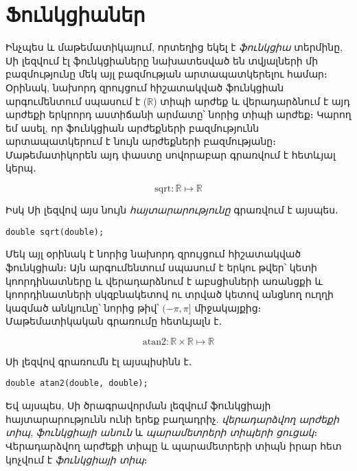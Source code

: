 \chapter{Ֆունկցիաներ}


Ինչպես և մաթեմատիկայում, որտեղից եկել է \emph{ֆունկցիա}
 տերմինը, Սի լեզվում էլ ֆունկցիաները նախատեսված
են տվյալների մի բազմությունը մեկ այլ բազմության արտապատկերելու
համար։ Օրինակ, նախորդ զրույցում հիշատակված 
ֆունկցիան արգումենտում սպասում է  (\(\mathbb{R}\)) տիպի
արժեք և վերադարձնում է այդ արժեքի երկրորդ աստիճանի արմատը՝ նորից
 տիպի արժեք։ Կարող եմ ասել, որ  ֆունկցիան
 արժեքների բազմությունն արտապատկերում է նույն
 արժեքների բազմությանը։ Մաթեմատիկորեն այդ փաստը
սովորաբար գրառվում է հետևյալ կերպ․

\[
\mathrm{sqrt}: \mathbb{R}\mapsto\mathbb{R}
\]

Իսկ Սի լեզվով այս նույն \emph{հայտարարությունը} գրառվում է այսպես․

\begin{Verbatim}
double sqrt(double);
\end{Verbatim}

Մեկ այլ օրինակ է նորից նախորդ զրույցում հիշատակված 
 ֆունկցիան։ Այն արգումենտում սպասում է երկու 
թվեր՝ կետի կոորդինատները և վերադարձնում է աբսցիսների առանցքի և
կոորդինատների սկզբնակետով ու տրված կետով անցնող ուղղի կազմած անկյունը՝
նորից  թիվ՝ \((−\pi, \pi]\) միջակայքից։ Մաթեմատիկական
գրառումը հետևյալն է․

\[
\mathrm{atan2}: \mathbb{R}\times\mathbb{R}\mapsto\mathbb{R}
\]

Սի լեզվով գրառումն էլ այսպիսինն է․

\begin{Verbatim}
double atan2(double, double);
\end{Verbatim}

Եվ այսպես, Սի ծրագրավորման լեզվում ֆունկցիայի հայտարարությունն ունի
երեք բաղադրիչ. \emph{վերադարձվող արժեքի տիպ}, \emph{ֆունկցիայի անուն}
և \emph{պարամետրերի տիպերի ցուցակ}։ Վերադարձվող արժեքի տիպը և
պարամետրերի տիպն իրար հետ կոչվում է \emph{ֆունկցիայի տիպ}։


